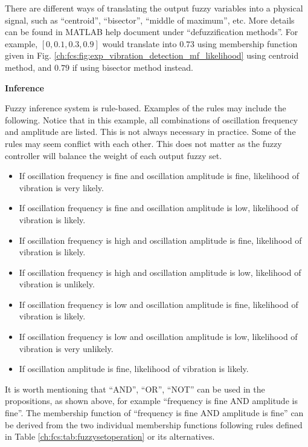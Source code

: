 There are different ways of translating the output fuzzy variables into a physical signal, such as ``centroid'', ``bisector'', ``middle of maximum'', etc. More details can be found in MATLAB help document under ``defuzzification methods''. For example, $[0, 0.1, 0.3, 0.9]$ would translate into $0.73$ using membership function given in Fig. \ref{ch:fcs:fig:exp_vibration_detection_mf_likelihood} using centroid method, and $0.79$ if using bisector method instead.

\vspace{0.1in}
\noindent \textbf{Inference}
\vspace{0.1in}

Fuzzy inference system is rule-based. Examples of the rules may include the following. Notice that in this example, all combinations of oscillation frequency and amplitude are listed. This is not always necessary in practice. Some of the rules may seem conflict with each other. This does not matter as the fuzzy controller will balance the weight of each output fuzzy set.
\begin{itemize}
	\item If oscillation frequency is fine and oscillation amplitude is fine, likelihood of vibration is very likely.
	\item If oscillation frequency is fine and oscillation amplitude is low, likelihood of vibration is likely.
	\item If oscillation frequency is high and oscillation amplitude is fine, likelihood of vibration is likely.
	\item If oscillation frequency is high and oscillation amplitude is low, likelihood of vibration is unlikely.
	\item If oscillation frequency is low and oscillation amplitude is fine, likelihood of vibration is likely.
	\item If oscillation frequency is low and oscillation amplitude is low, likelihood of vibration is very unlikely.
	\item If oscillation amplitude is fine, likelihood of vibration is likely.
\end{itemize}

It is worth mentioning that ``AND'', ``OR'', ``NOT'' can be used in the propositions, as shown above, for example ``frequency is fine AND amplitude is fine''. The membership function of ``frequency is fine AND amplitude is fine'' can be derived from the two individual membership functions following rules defined in Table \ref{ch:fcs:tab:fuzzysetoperation} or its alternatives.


